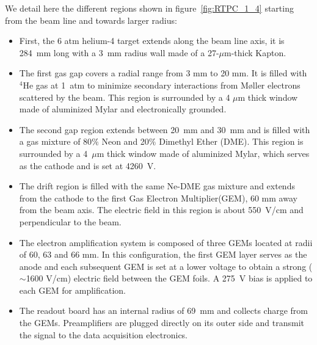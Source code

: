 \documentclass[twocolumn,showpacs,superscriptaddress,groupedaddress]{revtex4}
\begin{document}
We detail here the different regions shown in figure~\ref{fig:RTPC_1_4} starting 
from the beam line and towards larger radius:\\
\begin{itemize}
   \item First, the 6 atm helium-4 target extends along the beam line axis, it 
      is 284~mm long with a 3~mm radius wall made of a 27-$\mu$m-thick Kapton.
   \item The first gas gap covers a radial range from 3 mm to 20 mm. It is 
      filled with $^{4}$He gas at 1~atm to minimize secondary interactions from
      M\o ller electrons scattered by the beam. This 
      region is surrounded by a 4 $\mu$m thick window made of aluminized Mylar 
      and electronically grounded.
   \item The second gap region extends between 20~mm and 30~mm and is filled with a 
      gas mixture of 80$\%$ Neon and 20$\%$ Dimethyl Ether (DME). This region 
      is surrounded by a 4~$\mu$m thick window made of aluminized Mylar, which 
      serves as the cathode and is set at 4260~V.
   \item The drift region is filled with the same Ne-DME gas mixture and extends 
      from the cathode to the first Gas Electron Multiplier(GEM), 60 mm away 
      from the beam axis. The electric field in this region is about 550~V/cm 
      and perpendicular to the beam.
   \item The electron amplification system is composed of three GEMs located at 
      radii of 60, 63 and 66 mm. In this configuration, the first GEM layer 
      serves as the anode and each subsequent GEM is set at a lower voltage to
      obtain a strong ($\sim$1600 V/cm) electric field between the GEM foils. A 
      275~V bias is applied to each GEM for amplification.
   \item The readout board has an internal radius of 69~mm and collects charge
     from the GEMs. Preamplifiers are plugged directly on its outer side and
     transmit the signal to the data acquisition electronics.
\end{itemize}
\end{document}
